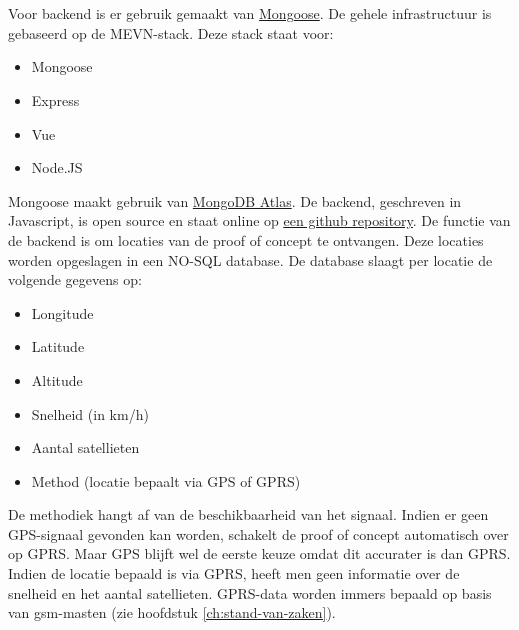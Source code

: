 \section{}
\label{ch:backend}

\subsection{}
Voor backend is er gebruik gemaakt van \href{https://mongoosejs.com/}{Mongoose}. De gehele infrastructuur is gebaseerd op de MEVN-stack.
Deze stack staat voor:
\begin{itemize}
	\item Mongoose
	\item Express
	\item Vue
	\item Node.JS
\end{itemize}
Mongoose maakt gebruik van \href{https://www.mongodb.com/cloud/atlas}{MongoDB Atlas}. De backend, geschreven in Javascript, is open source en staat online op \underline{\href{https://github.com/IndyVC/bap-backend}{een github repository}}.
\newline
De functie van de backend is om locaties van de proof of concept te ontvangen. Deze locaties worden opgeslagen in een NO-SQL database. De database slaagt per locatie de volgende gegevens op:
\begin{itemize}
	\item Longitude
	\item Latitude
	\item Altitude
	\item Snelheid (in km/h)
	\item Aantal satellieten
	\item Method (locatie bepaalt via GPS of GPRS)
\end{itemize}
De methodiek hangt af van de beschikbaarheid van het signaal. Indien er geen GPS-signaal gevonden kan worden, schakelt de proof of concept automatisch over op GPRS. Maar GPS blijft wel de eerste keuze omdat dit accurater is dan GPRS. Indien de locatie bepaald is via GPRS, heeft men geen informatie over de snelheid en het aantal satellieten. GPRS-data worden immers bepaald op basis van gsm-masten (zie hoofdstuk \ref{ch:stand-van-zaken}).

